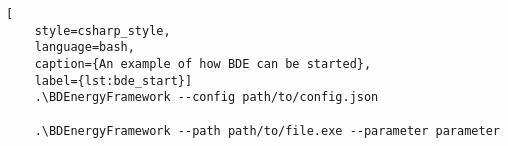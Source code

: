 \begin{lstlisting}[
    style=csharp_style,
    language=bash, 
    caption={An example of how BDE can be started},
    label={lst:bde_start}]
    .\BDEnergyFramework --config path/to/config.json
    
    .\BDEnergyFramework --path path/to/file.exe --parameter parameter

\end{lstlisting}